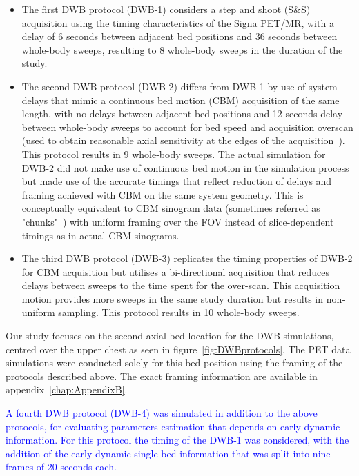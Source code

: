 \begin{itemize}
\item The first DWB protocol (DWB-1) considers a step and shoot (S\&S) acquisition using the timing characteristics of the Signa PET/MR, with a delay of 6 seconds between adjacent bed positions and 36 seconds between whole-body sweeps, resulting to 8 whole-body sweeps in the duration of the study. \\

\item The second DWB protocol (DWB-2) differs from DWB-1 by use of system delays that mimic a continuous bed motion (CBM) acquisition of the same length, with no delays between adjacent bed positions and 12 seconds delay between whole-body sweeps to account for bed speed and acquisition overscan (used to obtain reasonable axial sensitivity at the edges of the acquisition~\cite{Panin2014}). This protocol results in 9 whole-body sweeps. The actual simulation for DWB-2 did not make use of continuous bed motion in the simulation process but made use of the accurate timings that reflect reduction of delays and framing achieved with CBM on the same system geometry. This is conceptually equivalent to CBM sinogram data (sometimes referred as "chunks"~\cite{Hu2014}) with uniform framing over the FOV instead of slice-dependent timings as in actual CBM sinograms. \\

\item The third DWB protocol (DWB-3) replicates the timing properties of DWB-2 for CBM acquisition but utilises a bi-directional acquisition that reduces delays between sweeps to the time spent for the over-scan. This acquisition motion provides more sweeps in the same study duration but results in non-uniform sampling. This protocol results in 10 whole-body sweeps.
\end{itemize}
\noindent 
Our study focuses on the second axial bed location for the DWB simulations, centred over the upper chest as seen in figure~\ref{fig:DWBprotocols}.
The PET data simulations were conducted solely for this bed position using the framing of the protocols described above. The exact framing information are available in appendix~\ref{chap:AppendixB}.%

\textcolor{blue}{
A fourth DWB protocol (DWB-4) was simulated in addition to the above protocols, for evaluating parameters estimation that depends on early dynamic information. For this protocol the timing of the DWB-1 was considered, with the addition of the early dynamic single bed information that was split into nine frames of 20 seconds each.}



